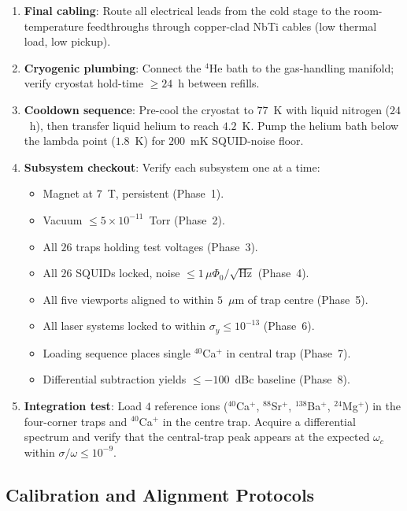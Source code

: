 \begin{enumerate}[leftmargin=1.5em]
    \item \textbf{Final cabling}: Route all electrical leads from the cold stage to the room-temperature feedthroughs through copper-clad NbTi cables (low thermal load, low pickup).
    \item \textbf{Cryogenic plumbing}: Connect the $^4$He bath to the gas-handling manifold; verify cryostat hold-time $\ge 24$~h between refills.
    \item \textbf{Cooldown sequence}: Pre-cool the cryostat to $77$~K with liquid nitrogen ($24$~h), then transfer liquid helium to reach $4.2$~K. Pump the helium bath below the lambda point ($1.8$~K) for $200$~mK SQUID-noise floor.
    \item \textbf{Subsystem checkout}: Verify each subsystem one at a time:
    \begin{itemize}[nosep]
        \item Magnet at $7$~T, persistent (Phase~1).
        \item Vacuum $\le 5\times10^{-11}$~Torr (Phase~2).
        \item All $26$ traps holding test voltages (Phase~3).
        \item All $26$ SQUIDs locked, noise $\le 1\,\mu\Phi_0/\sqrt{\text{Hz}}$ (Phase~4).
        \item All five viewports aligned to within $5$~$\mu$m of trap centre (Phase~5).
        \item All laser systems locked to within $\sigma_y \le 10^{-13}$ (Phase~6).
        \item Loading sequence places single $^{40}$Ca$^+$ in central trap (Phase~7).
        \item Differential subtraction yields $\le -100$~dBc baseline (Phase~8).
    \end{itemize}
    \item \textbf{Integration test}: Load $4$ reference ions ($^{40}$Ca$^+$, $^{88}$Sr$^+$, $^{138}$Ba$^+$, $^{24}$Mg$^+$) in the four-corner traps and $^{40}$Ca$^+$ in the centre trap. Acquire a differential spectrum and verify that the central-trap peak appears at the expected $\omega_c$ within $\sigma/\omega \le 10^{-9}$.
\end{enumerate}

\subsection{Calibration and Alignment Protocols}
\label{subsec:calibration}

